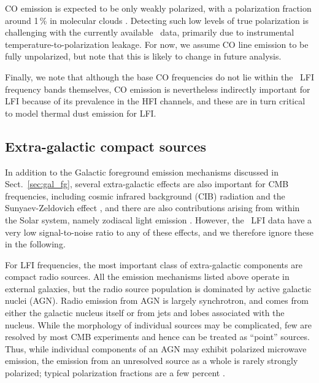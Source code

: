 \documentclass[twocolumn]{aa}
\begin{document}
CO emission is expected to be only weakly polarized, with a
polarization fraction around 1\,\% in molecular clouds
\citep{greaves:1999}. Detecting such low levels of true polarization
is challenging with the currently available \Planck\ data, primarily
due to instrumental temperature-to-polarization leakage. For now, we
assume CO line emission to be fully unpolarized, but note that this 
is likely to change in future analysis.

Finally, we note that although the base CO frequencies do not lie
within the \Planck\ LFI frequency bands themselves, CO emission is
nevertheless indirectly important for LFI because of its prevalence in
the HFI channels, and these are in turn critical to model thermal dust
emission for LFI.

\subsection{Extra-galactic compact sources}
\label{sec:pointsources}

In addition to the Galactic foreground emission mechanisms discussed
in Sect.~\ref{sec:gal_fg}, several extra-galactic effects are also
important for CMB frequencies, including cosmic infrared background
(CIB) radiation \citep{hauser:2001} and the Sunyaev-Zeldovich effect
\citep{sunyaev:1972}, and there are also contributions arising from
within the Solar system, namely zodiacal light emission
\citep{kelsall1998,planck2014-a12,san:2022}. However, the \Planck\ LFI
data have a very low signal-to-noise ratio to any of these effects,
and we therefore ignore these in the following.

For LFI frequencies, the most important class of extra-galactic
components are compact radio sources. All the emission mechanisms
listed above operate in external galaxies, but the radio source
population is dominated by active galactic nuclei (AGN). Radio
emission from AGN is largely synchrotron, and comes from either the
galactic nucleus itself or from jets and lobes associated with the
nucleus.  While the morphology of individual sources may be
complicated, few are resolved by most CMB experiments and hence can be
treated as ``point'' sources. Thus, while individual components of an
AGN may exhibit polarized microwave emission, the emission from an unresolved 
source as a whole is rarely strongly polarized; typical polarization
fractions are a few percent \citep{datta2019}. 
\end{document}
